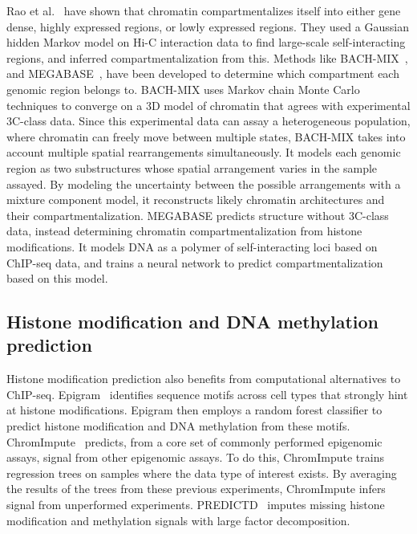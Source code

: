 \documentclass[5p]{elsarticle}
\newcommand{\rev}[1]{{\color{black}#1}}
\begin{document}
Rao et al.~\cite{Rao2014ALooping} have shown that chromatin compartmentalizes itself into either gene dense, highly expressed regions, or lowly expressed regions.
They used a Gaussian hidden Markov model on Hi-C interaction data to find large-scale \rev{self-interact\-ing} regions, and inferred compartmentalization from this.
Methods like BACH-MIX~\cite{Hu2013BayesianChromosomes}, and MEGABASE~\cite{DiPierro2017DeArchitecture}, have been developed to determine which compartment each genomic region belongs to.
BACH-MIX uses Markov chain Monte Carlo techniques to converge on a 3D model of chromatin that agrees with experimental 3C-class data.
Since this experimental data can assay a heterogeneous population, where chromatin can freely move between multiple states, BACH-MIX takes into account multiple spatial rearrangements simultaneously.
It models each genomic region as two substructures whose spatial arrangement varies in the sample assayed.
By modeling the uncertainty between the possible arrangements with a mixture component model, it reconstructs likely chromatin architectures and their compartmentalization.
MEGABASE predicts structure without 3C-class data, instead determining chromatin compartmentalization from histone modifications.
It models DNA as a polymer of self-inter\-act\-ing loci based on ChIP-seq data, and trains a neural network to predict compartmentalization based on this model.

\subsection{Histone modification and DNA methylation prediction}

Histone modification prediction also benefits from computational alternatives to ChIP-seq.
Epigram~\cite{Whitaker2015PredictingMotifs} identifies sequence motifs across cell types that strongly hint at histone modifications.
Epigram then employs a random forest classifier to predict histone modification and DNA methylation from these motifs.
ChromImpute~\cite{Ernst2015Large-scaleTissues} predicts, from a core set of commonly performed epigenomic assays, signal from other epigenomic assays.
To do this, ChromImpute trains regression trees on samples where the data type of interest exists.
By averaging the results of the trees from these previous experiments, ChromImpute infers signal from unperformed experiments.
PREDICTD~\cite{Durham2018PREDICTDDecomposition} imputes missing histone modification and methylation signals with large factor decomposition.
\end{document}
